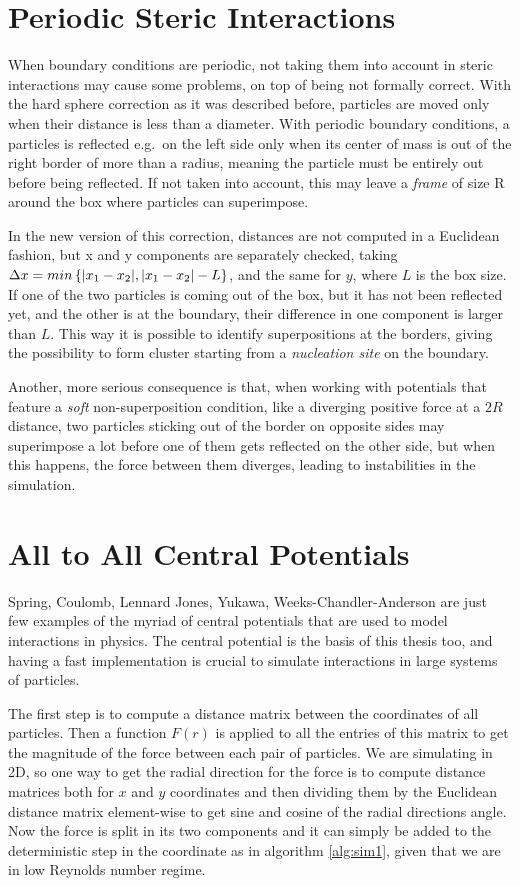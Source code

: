 \documentclass[../../master_thesis_np.tex]{subfiles}
\begin{document}
	\section{Periodic Steric Interactions}
	When boundary conditions are periodic, not taking them into account in steric interactions may cause some problems, on top of being not formally correct. With the hard sphere correction as it was described before, particles are moved only when their distance is less than a diameter. With periodic boundary conditions, a particles is reflected e.g.~on the left side only when its center of mass is out of the right border of more than a radius, meaning the particle must be entirely out before being reflected. If not taken into account, this may leave a \emph{frame} of size R around the box where particles can superimpose. 
	
	In the new version of this correction, distances are not computed in a Euclidean fashion, but x and y components are separately checked, taking $\Delta x = min \left\{ \abs{x_1-x_2}, \abs{x_1-x_2}-L \right\}$, and the same for $y$, where $L$ is the box size. If one of the two particles is coming out of the box, but it has not been reflected yet, and the other is at the boundary, their difference in one component is larger than $L$. This way it is possible to identify superpositions at the borders, giving the possibility to form cluster starting from a \emph{nucleation site} on the boundary. 
	
	Another, more serious consequence is that, when working with potentials that feature a \emph{soft} non-superposition condition, like a diverging positive force at a $2R$ distance, two particles sticking out of the border on opposite sides may superimpose a lot before one of them gets reflected on the other side, but when this happens, the force between them diverges, leading to instabilities in the simulation.
	
	\section{All to All Central Potentials}
	Spring, Coulomb, Lennard Jones, Yukawa, Weeks-Chandler-Anderson are just few examples of the myriad of central potentials that are used to model interactions in physics. The central potential is the basis of this thesis too, and having a fast implementation is crucial to simulate interactions in large systems of particles. 
	
	The first step is to compute a distance matrix between the coordinates of all particles. Then a function $F(r)$ is applied to all the entries of this matrix to get the magnitude of the force between each pair of particles. We are simulating in 2D, so one way to get the radial direction for the force is to compute distance matrices both for $x$ and $y$ coordinates and then dividing them by the Euclidean distance matrix element-wise to get sine and cosine of the radial directions angle. Now the force is split in its two components and it can simply be added to the deterministic step in the coordinate as in algorithm \ref{alg:sim1}, given that we are in low Reynolds number regime. 
	
\end{document}
